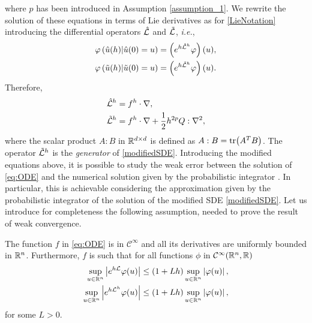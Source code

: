 where $p$ has been introduced in Assumption \ref{assumption_1}. We rewrite the solution of these equations in terms of Lie derivatives as for \eqref{LieNotation} introducing the differential operators $\hat {\mathcal{L}}$ and $\tilde {\mathcal{L}}$, \textit{i.e.},
\begin{equation}\label{LieNotationModif}
\begin{aligned}
	\varphi\left(\hat u(h) | \hat u(0) = u\right) &= \left(e^{h\hat{\mathcal{L}}^h}\varphi\right)(u), \\
	\varphi\left(\tilde u(h)|\tilde u(0) = u\right) &= \left(e^{h\tilde{\mathcal{L}}^h}\varphi\right)(u).
\end{aligned}
\end{equation}
Therefore,
\begin{equation}
\begin{aligned}
	\hat {\mathcal{L}}^h &= f^h \cdot \nabla, \\
	\tilde {\mathcal{L}}^h &= f^h \cdot \nabla + \frac{1}{2} h^{2p} Q : \nabla^2,
\end{aligned}
\end{equation}
where the scalar product $A : B$ in $\mathbb{R}^{d\times d}$ is defined as $A : B = \tr(A^TB)$. The operator $\tilde {\mathcal{L}}^h$ is the \textit{generator} of \eqref{modifiedSDE}. Introducing the modified equations above, it is possible to study the weak error between the solution of \eqref{eq:ODE} and the numerical solution given by the probabilistic integrator \cite{CGS16}. In particular, this is achievable considering the approximation given by the probabilistic integrator of the solution of the modified SDE \eqref{modifiedSDE}. Let us introduce for completeness the following assumption, needed to prove the result of weak convergence. 
\begin{assumption} \label{assumption_3}The function $f$ in \eqref{eq:ODE} is in $\mathcal C^\infty$ and all its derivatives are uniformly bounded in $\mathbb{R}^n$. Furthermore, $f$ is such that for all functions $\phi$ in $\mathcal C ^\infty(\mathbb{R}^n, \mathbb{R})$ 
\begin{equation}
\begin{aligned}
	\sup_{u\in\mathbb{R}^n} \left| e^{h\mathcal{L}} \varphi(u) \right| &\leq (1 + Lh) \sup_{u\in\mathbb{R}^n} \left|\varphi(u)\right|, \\
	\sup_{u\in\mathbb{R}^n} \left| e^{h\mathcal{L}^h} \varphi(u) \right| &\leq (1 + Lh) \sup_{u\in\mathbb{R}^n} \left|\varphi(u)\right|, \\
\end{aligned}
\end{equation}
for some $L > 0$.
\end{assumption}
